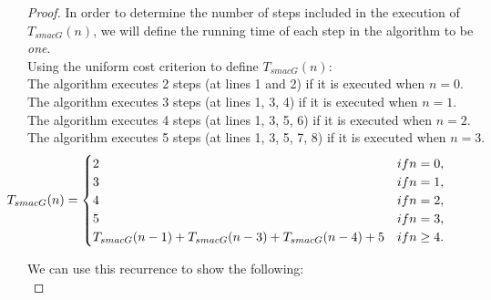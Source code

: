 \documentclass[12pt]{article}
\begin{document}
\begin{proof}
    In order to determine the number of steps included in the execution of $T_{smacG}(n)$, we will define the running time of each step in the algorithm to be \textit{one}.\\

    \noindent Using the uniform cost criterion to define $T_{smacG}(n)$: \\
    
    \noindent The algorithm executes 2 steps (at lines 1 and 2) if it is executed when $n = 0$. \\
    \noindent The algorithm executes 3 steps (at lines 1, 3, 4) if it is executed when $n = 1$. \\
    \noindent The algorithm executes 4 steps (at lines 1, 3, 5, 6) if it is executed when $n = 2$. \\
    \noindent The algorithm executes 5 steps (at lines 1, 3, 5, 7, 8) if it is executed when $n = 3$. \\
    
    
    \[ \hspace*{-17mm}T_{smacG}(n) = 
        \begin{cases} 
          2 & if n = 0, \\
          3 & if n = 1, \\
          4 & if n = 2, \\
          5 & if n = 3, \\
          T_{smacG}(n-1) + T_{smacG}(n-3) + T_{smacG}(n-4) + 5 & if n \geq 4.
       \end{cases}
    \]
    
    \noindent We can use this recurrence to show the following:\\
    

\end{proof}
\end{document}
